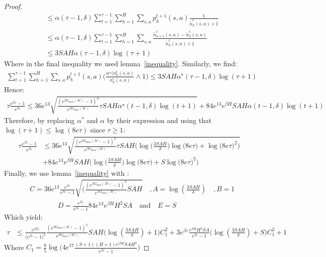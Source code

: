 \documentclass[final,12pt]{colt2026} %
\begin{document}
\begin{proof}
\begin{align*}
    &\leq \alpha(\tau-1,\delta)\sum_{t=1}^{\tau -1}\sum_{h=1}^H \sum_{s,a} p_h^{t+1}(s,a)\frac{1}{\widetilde{n}_h^t(s,a) \vee 1} \\
    &\leq \alpha(\tau-1,\delta) \sum_{t=1}^{\tau -1}\sum_{h=1}^H \sum_{s,a}\frac{\widetilde{n}_{h+1}^t(s,a) - \widetilde{n}_h^t(s,a)}{\widetilde{n}_h^t(s,a) \vee 1} \\
    &\leq 3 SAH\alpha(\tau-1,\delta) \log(\tau + 1)
\end{align*}
Where in the final inequality we used lemma~\ref{inequality}. Similarly, we find:
\begin{align*}
    \sum_{t=1}^{\tau -1}\sum_{h=1}^H \sum_{s,a} p_h^{t+1}(s,a)\big(\frac{\alpha^\star\big(n_h^t(s,a)}{n_h^t(s,a)} \wedge 1 \big) \leq 3 SAH\alpha^\star(\tau-1,\delta) \log(\tau + 1)
\end{align*}
Hence:
\begin{align*}
    \tau \frac{e^{\beta \varepsilon} - 1}{e^{\beta \varepsilon}} \leq  36 e^{13}  \sqrt{\frac{(e^{\beta G_{\text{max}}(\mathcal{M})} - 1)^2}{e^{\beta G_{\text{max}}(\mathcal{M})}}\tau SAH\alpha^\star(t-1,\delta) \log(t + 1)} + 84 e^{13} e^{\beta H}SAH\alpha(t-1,\delta) \log(t + 1)
\end{align*}
Therefore, by replacing $\alpha^*$ and $\alpha$ by their expression and using that $\log(\tau + 1) \leq \log(8 e \tau)$ since $\tau \geq 1$:
\begin{align*}
    \tau \frac{e^{\beta \varepsilon} - 1}{e^{\beta \varepsilon}}  &\leq 36 e^{13}  \sqrt{\frac{(e^{\beta G_{\text{max}}(\mathcal{M})} - 1)^2}{e^{\beta G_{\text{max}}(\mathcal{M})}}\tau SAH\Big(\log\big(\frac{3 SAH}{\delta}\big)\log\big(8 e \tau \big) + \log\big( 8 e \tau\big)^2\Big)}\\& + 84 e^{13} e^{\beta H}SAH\Big(\log\big(\frac{3 SAH}{\delta}\big)\log\big(8 e \tau \big) + S\log\big( 8 e \tau\big)^2\Big)
\end{align*}
Finally, we use lemma~\ref{inequality} with :
\begin{align*}
    &C= 36 e^{13}  \frac{e^{\beta \varepsilon}}{e^{\beta \varepsilon} - 1} \sqrt{(\frac{(e^{\beta G_{\text{max}}(\mathcal{M})} - 1)^2}{e^{\beta G_{\text{max}}(\mathcal{M})}} SAH} \quad, A = \log(\frac{3SAH}{\delta}) \quad, B = 1\\&\quad \quad \quad \quad  D = \frac{e^{\beta \varepsilon}}{e^{\beta \varepsilon} - 1}84e^{13} e^{\beta H} H^2 SA \quad \text{and} \quad E = S\end{align*}
    Which yield:
\begin{align*}
    \tau &\leq \frac{e^{2\beta \varepsilon}}{\big(e^{\beta \varepsilon} - 1\big)^2}\frac{(e^{\beta G_{\text{max}}(\mathcal{M})} - 1)^2}{e^{\beta G_{\text{max}}(\mathcal{M})}} SAH \bigg(\log(\frac{3SAH}{\delta}) + 1 \bigg) C_1^2 + 3 e^{\beta \varepsilon}\frac{e^{\beta H} H^2 SA}{e^{\beta \varepsilon} - 1}\bigg(\log(\frac{3SAH}{\delta}) + S\bigg)C_1^2 + 1
\end{align*}
Where $C_1 = \frac{8}{5} \log\bigg(4 e^{17} \frac{(S+1)(H+1) e^{|\beta H} S A H^2}{e^{\beta \varepsilon} - 1}\bigg) $


\end{proof}
\end{document}
